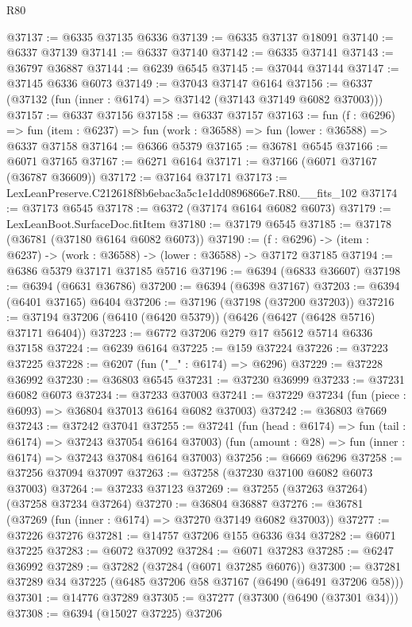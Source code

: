 \begin{lexlean}{R80}
\begin{coremodule}
@37137 := @6335 @37135 @6336
@37139 := @6335 @37137 @18091
@37140 := @6337 @37139
@37141 := @6337 @37140
@37142 := @6335 @37141
@37143 := @36797 @36887
@37144 := @6239 @6545
@37145 := @37044 @37144
@37147 := @37145 @6336 @6073
@37149 := @37043 @37147 @6164
@37156 := @6337 (@37132 (fun (inner : @6174) => @37142 (@37143 @37149 @6082 @37003)))
@37157 := @6337 @37156
@37158 := @6337 @37157
@37163 := fun (f : @6296) =>
  fun (item : @6237) => fun (work : @36588) => fun (lower : @36588) => @6337 @37158
@37164 := @6366 @5379
@37165 := @36781 @6545
@37166 := @6071 @37165
@37167 := @6271 @6164
@37171 := @37166 (@6071 @37167 (@36787 @36609))
@37172 := @37164 @37171
@37173 := LexLeanPreserve.C212618f8b6ebac3a5c1e1dd0896866e7.R80.__fits_102
@37174 := @37173 @6545
@37178 := @6372 (@37174 @6164 @6082 @6073)
@37179 := LexLeanBoot.SurfaceDoc.fitItem
@37180 := @37179 @6545
@37185 := @37178 (@36781 (@37180 @6164 @6082 @6073))
@37190 := (f : @6296) -> (item : @6237) -> (work : @36588) -> (lower : @36588) -> @37172 @37185
@37194 := @6386 @5379 @37171 @37185 @5716
@37196 := @6394 (@6833 @36607)
@37198 := @6394 (@6631 @36786)
@37200 := @6394 (@6398 @37167)
@37203 := @6394 (@6401 @37165) @6404
@37206 := @37196 (@37198 (@37200 @37203))
@37216 := @37194 @37206 (@6410 (@6420 @5379)) (@6426 (@6427 (@6428 @5716) @37171 @6404))
@37223 := @6772 @37206 @279 @17 @5612 @5714 @6336 @37158
@37224 := @6239 @6164
@37225 := @159 @37224
@37226 := @37223 @37225
@37228 := @6207 (fun ("_" : @6174) => @6296)
@37229 := @37228 @36992
@37230 := @36803 @6545
@37231 := @37230 @36999
@37233 := @37231 @6082 @6073
@37234 := @37233 @37003
@37241 := @37229 @37234 (fun (piece : @6093) => @36804 @37013 @6164 @6082 @37003)
@37242 := @36803 @7669
@37243 := @37242 @37041
@37255 := @37241
    (fun (head : @6174) => fun (tail : @6174) => @37243 @37054 @6164 @37003)
    (fun (amount : @28) => fun (inner : @6174) => @37243 @37084 @6164 @37003)
@37256 := @6669 @6296
@37258 := @37256 @37094 @37097
@37263 := @37258 (@37230 @37100 @6082 @6073 @37003)
@37264 := @37233 @37123
@37269 := @37255 (@37263 @37264) (@37258 @37234 @37264)
@37270 := @36804 @36887
@37276 := @36781 (@37269 (fun (inner : @6174) => @37270 @37149 @6082 @37003))
@37277 := @37226 @37276
@37281 := @14757 @37206 @155 @6336 @34
@37282 := @6071 @37225
@37283 := @6072 @37092
@37284 := @6071 @37283
@37285 := @6247 @36992
@37289 := @37282 (@37284 (@6071 @37285 @6076))
@37300 := @37281 @37289 @34 @37225 (@6485 @37206 @58 @37167 (@6490 (@6491 @37206 @58)))
@37301 := @14776 @37289
@37305 := @37277 (@37300 (@6490 (@37301 @34)))
@37308 := @6394 (@15027 @37225) @37206

\end{coremodule}
\end{lexlean}
